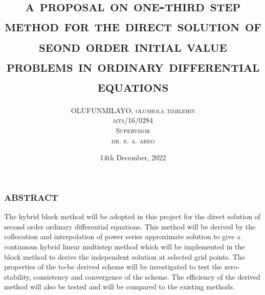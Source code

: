 \documentclass[compress, 19pt, blue]{beamer}
\title{\textsc{a proposal on one-third step method for the direct solution of seond order initial value problems in ordinary differential equations} }
\author{\textsc{OLUFUNMILAYO, olushola timilehin \\ mts/16/0284\\Supervisor\\dr. e. a. areo}}
\date{14th December, 2022}
\begin{document}
	\begin{frame}
	\titlepage
\end{frame}
\begin{frame}
	\frametitle{\textbf{ABSTRACT}}
	\color{blue}
	\begin{center}
	The hybrid block method will be adopted in this project for the direct solution of second order ordinary differential equations. This method will be derived by the collocation and interpolation of power series approximate solution to give a continuous hybrid linear multistep method which will be implemented in the block method to derive the independent solution at selected grid points. The properties of the to-be derived scheme will be investigated to test the zero-stability, consistency and convergence of the scheme. The efficiency of the derived method will also be tested and will be compared to the existing methods.
	\end{center}
\end{frame}
	
\end{document}
